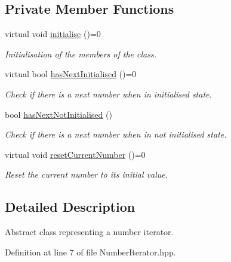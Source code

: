 \subsection*{Private Member Functions}
\begin{DoxyCompactItemize}
\item 
virtual void \hyperlink{classmultiscale_1_1NumberIterator_a0bfeef7c3f120a5ae8d49d89b4529d6e}{initialise} ()=0
\begin{DoxyCompactList}\small\item\em Initialisation of the members of the class. \end{DoxyCompactList}\item 
virtual bool \hyperlink{classmultiscale_1_1NumberIterator_a3c84ccdf0e279e67861b3cce34a26588}{has\-Next\-Initialised} ()=0
\begin{DoxyCompactList}\small\item\em Check if there is a next number when in initialised state. \end{DoxyCompactList}\item 
bool \hyperlink{classmultiscale_1_1NumberIterator_a446f1ec484d5e16092674c5de25150f1}{has\-Next\-Not\-Initialised} ()
\begin{DoxyCompactList}\small\item\em Check if there is a next number when in not initialised state. \end{DoxyCompactList}\item 
virtual void \hyperlink{classmultiscale_1_1NumberIterator_a21e658de178b6c957df5ea0482e6fbd6}{reset\-Current\-Number} ()=0
\begin{DoxyCompactList}\small\item\em Reset the current number to its initial value. \end{DoxyCompactList}\end{DoxyCompactItemize}


\subsection{Detailed Description}
Abstract class representing a number iterator. 

Definition at line 7 of file Number\-Iterator.\-hpp.



